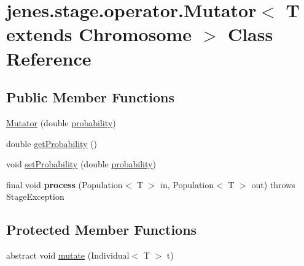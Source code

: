 \hypertarget{classjenes_1_1stage_1_1operator_1_1_mutator_3_01_t_01extends_01_chromosome_01_4}{
\section{jenes.stage.operator.Mutator$<$ T extends Chromosome $>$ Class Reference}
\label{classjenes_1_1stage_1_1operator_1_1_mutator_3_01_t_01extends_01_chromosome_01_4}
}
\subsection*{Public Member Functions}
\begin{CompactItemize}
\item 
\hyperlink{classjenes_1_1stage_1_1operator_1_1_mutator_3_01_t_01extends_01_chromosome_01_4_01aea5c94d65f99cca8a24be7250a06a}{Mutator} (double \hyperlink{classjenes_1_1stage_1_1operator_1_1_mutator_3_01_t_01extends_01_chromosome_01_4_60f38eb7afd1ad6a7d1c0c639df2d5fe}{probability})
\item 
double \hyperlink{classjenes_1_1stage_1_1operator_1_1_mutator_3_01_t_01extends_01_chromosome_01_4_f8cd41f87d99e8bc5d00bf9a21ffcd86}{getProbability} ()
\item 
void \hyperlink{classjenes_1_1stage_1_1operator_1_1_mutator_3_01_t_01extends_01_chromosome_01_4_49b8a34032a575badd2080d6c90397cb}{setProbability} (double \hyperlink{classjenes_1_1stage_1_1operator_1_1_mutator_3_01_t_01extends_01_chromosome_01_4_60f38eb7afd1ad6a7d1c0c639df2d5fe}{probability})
\item 
\hypertarget{classjenes_1_1stage_1_1operator_1_1_mutator_3_01_t_01extends_01_chromosome_01_4_091269db32219198b26860ee4b295345}{
final void \textbf{process} (Population$<$ T $>$ in, Population$<$ T $>$ out)  throws StageException }
\label{classjenes_1_1stage_1_1operator_1_1_mutator_3_01_t_01extends_01_chromosome_01_4_091269db32219198b26860ee4b295345}

\end{CompactItemize}
\subsection*{Protected Member Functions}
\begin{CompactItemize}
\item 
abstract void \hyperlink{classjenes_1_1stage_1_1operator_1_1_mutator_3_01_t_01extends_01_chromosome_01_4_5ea1c6fd8d4ed580d70e1fafd85bb3a8}{mutate} (Individual$<$ T $>$ t)
\end{CompactItemize}
